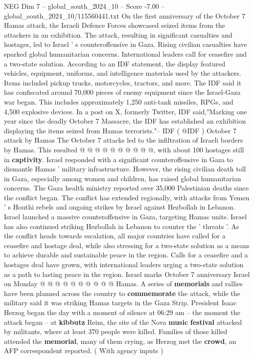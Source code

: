\begin{textsample}{NEG Dim 7 – global\_south\_2024\_10 – Score -7.00 – global\_south\_2024\_10/115560441.txt}  \label{ex:f7_neg_244}
On the first anniversary of the October 7 Hamas attack, the Israeli Defence Forces showcased seized items from the attackers in an exhibition.
The attack, resulting in significant casualties and hostages, led to Israel ' s counteroffensive in Gaza.
Rising civilian casualties have sparked global humanitarian concerns.
International leaders call for ceasefire and a two-state solution.
According to an IDF statement, the display featured vehicles, equipment, uniforms, and intelligence materials used by the attackers.
Items included pickup trucks, motorcycles, tractors, and more.
The IDF said it has confiscated around 70,000 pieces of enemy equipment since the Israel-Gaza war began.
This includes approximately 1,250 anti-tank missiles, RPGs, and 4,500 explosive devices.
In a post on X, formerly Twitter, IDF said,"Marking one year since the deadly October 7 Massacre, the IDF has established an exhibition displaying the items seized from Hamas terrorists."-- IDF ( @IDF ) October 7 attack by Hamas The October 7 attacks led to the infiltration of Israeli borders by Hamas.
This resulted @ @ @ @ @ @ @ @ @ @, with about 100 hostages still in \textbf{captivity}.
Israel responded with a significant counteroffensive in Gaza to dismantle Hamas ' military infrastructure.
However, the rising civilian death toll in Gaza, especially among women and children, has raised global humanitarian concerns.
The Gaza health ministry reported over 35,000 Palestinian deaths since the conflict began.
The conflict has extended regionally, with attacks from Yemen ' s Houthi rebels and ongoing strikes by Israel against Hezbollah in Lebanon.
Israel launched a massive counteroffensive in Gaza, targeting Hamas units.
Israel has also continued striking Hezbollah in Lebanon to counter the ' threats '.
As the conflict heads towards escalation, all major countries have called for a ceasefire and hostage deal, while also stressing for a two-state solution as a means to achieve durable and sustainable peace in the region.
Calls for a ceasefire and a hostages deal have grown, with international leaders urging a two-state solution as a path to lasting peace in the region.
Israel marks October 7 anniversary Israel on Monday @ @ @ @ @ @ @ @ @ @ Hamas.
A series of \textbf{memorials} and rallies have been planned across the country to \textbf{commemorate} the attack, while the military said it was striking Hamas targets in the Gaza Strip.
President Isaac Herzog began the day with a moment of silence at 06:29 am -- the moment the attack began -- at \textbf{kibbutz} Reim, the site of the Nova \textbf{music} \textbf{festival} attacked by militants, where at least 370 people were killed.
Families of those killed attended the \textbf{memorial}, many of them crying, as Herzog met the \textbf{crowd}, an AFP correspondent reported. ( With agency inputs )

\end{textsample}

